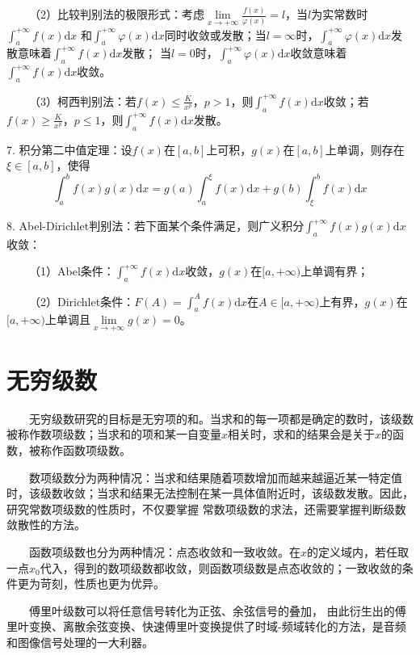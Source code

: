 ~~~~（2）比较判别法的极限形式：考虑$\lim\limits_{x\rightarrow+\infty}\frac{f(x)}{\varphi(x)}=l$，当$l$为实常数时$\int_a^{+\infty}f(x)\mathrm{d}x$
和$\int_a^{+\infty}\varphi(x)\mathrm{d}x$同时收敛或发散；当$l=\infty$时，$\int_a^{+\infty}\varphi(x)\mathrm{d}x$发散意味着$\int_a^{+\infty}f(x)\mathrm{d}x$发散；
当$l=0$时，$\int_a^{+\infty}\varphi(x)\mathrm{d}x$收敛意味着$\int_a^{+\infty}f(x)\mathrm{d}x$收敛。

~~~~（3）柯西判别法：若$f(x)\leqslant\frac{K}{x^p}$，$p>1$，则$\int_a^{+\infty}f(x)\mathrm{d}x$收敛；若$f(x)\geqslant \frac{K}{x^p}$，$p\leqslant 1$，则$\int_a^{+\infty}f(x)\mathrm{d}x$发散。

7. 积分第二中值定理：设$f(x)$在$[a,b]$上可积，$g(x)$在$[a,b]$上单调，则存在$\xi \in [a,b]$，使得
\begin{equation*}
    \int_a^b f(x)g(x)\mathrm{d}x=g(a)\int_a^\xi f(x)\mathrm{d}x+g(b)\int_\xi ^b f(x)\mathrm{d}x
\end{equation*}

8. Abel-Dirichlet判别法：若下面某个条件满足，则广义积分$\int_a^{+\infty} f(x)g(x)\mathrm{d}x$收敛：

~~~~（1）Abel条件：$\int_a^{+\infty}f(x)\mathrm{d}x$收敛，$g(x)$在$[a,+\infty)$上单调有界；

~~~~（2）Dirichlet条件：$F(A)=\int_a^Af(x)\mathrm{d}x$在$A\in[a,+\infty)$上有界，$g(x)$在$[a,+\infty)$上单调且$\lim\limits_{x\rightarrow +\infty}g(x)=0$。

\section{无穷级数}

\begin{tcolorbox}[colback=red!5,colframe=red!75!black]
    ~~~~无穷级数研究的目标是无穷项的和。当求和的每一项都是确定的数时，该级数被称作数项级数；当求和的项和某一自变量$x$相关时，求和的结果会是关于$x$的函数，被称作函数项级数。
    
    ~~~~数项级数分为两种情况：当求和结果随着项数增加而越来越逼近某一特定值时，该级数收敛；当求和结果无法控制在某一具体值附近时，该级数发散。因此，研究常数项级数的性质时，不仅要掌握
    常数项级数的求法，还需要掌握判断级数敛散性的方法。

    ~~~~函数项级数也分为两种情况：点态收敛和一致收敛。在$x$的定义域内，若任取一点$x_0$代入，得到的数项级数都收敛，则函数项级数是点态收敛的；一致收敛的条件更为苛刻，性质也更为优异。

    ~~~~傅里叶级数可以将任意信号转化为正弦、余弦信号的叠加，
    由此衍生出的傅里叶变换、离散余弦变换、快速傅里叶变换提供了时域-频域转化的方法，是音频和图像信号处理的一大利器。

\end{tcolorbox}

